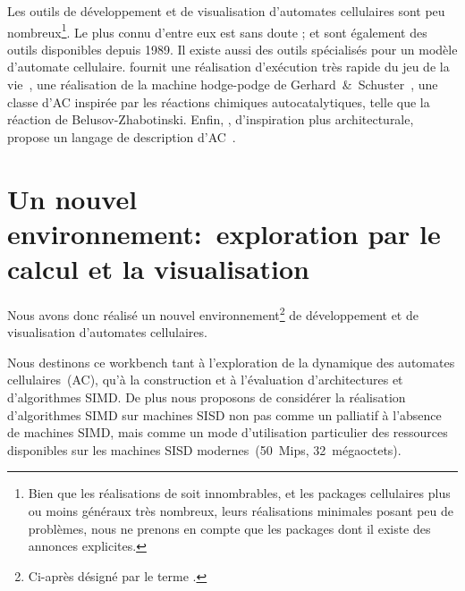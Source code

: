 Les outils de d\'eveloppement et de visualisation d'automates
cellulaires sont peu nombreux\footnote{%
  Bien que les r\'ealisations de  soit
  innombrables, et les packages cellulaires plus ou moins g\'en\'eraux tr\`es
  nombreux, leurs r\'ealisations minimales posant peu de probl\`emes, nous ne
  prenons en compte que les packages dont il existe des annonces
  explicites.}. %
Le plus connu d'entre eux est sans doute ;
 et  sont \'egalement des
outils disponibles depuis 1989. %
Il existe aussi des outils sp\'ecialis\'es pour un mod\`ele d'automate
cellulaire. %
 fournit une r\'ealisation d'ex\'ecution tr\`es rapide du
jeu de la vie~\cite[]{Berlekamp82},  une
r\'ealisation de la machine hodge-podge de
Gerhard~\&~Schuster~\cite[]{Dewdney88}, une classe d'AC inspir\'ee par
les r\'eactions chimiques autocatalytiques, telle que la r\'eaction de
Beluso\mbox{v-Z}habotinski. %
Enfin, , d'inspiration plus architecturale,
propose un langage de description d'AC~\cite[]{Eckart92a}. %
\nocite{Eckart92b}

\section[Le calcul et la visualisation]%
{Un nouvel environnement:~exploration par le calcul et la visualisation}

Nous avons donc r\'ealis\'e un nouvel environnement\footnote{%
  Ci-apr\`es d\'esign\'e par le terme .} %
de d\'eveloppement et de visualisation d'automates cellulaires. %

Nous destinons ce workbench tant \`a l'exploration de la dynamique
des automates cellulaires~(AC), qu'\`a la construction et \`a l'\'evaluation
d'architectures et d'algorithmes SIMD\@. %
De plus nous proposons de consid\'erer la r\'ealisation d'algorithmes SIMD
sur machines SISD non pas comme un palliatif \`a l'absence de machines
SIMD, mais comme un mode d'utilisation particulier des ressources
disponibles sur les machines SISD modernes~(50~Mips, 32~m\'egaoctets). %


